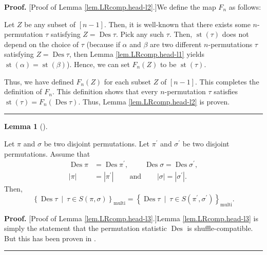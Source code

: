 \documentclass[numbers=enddot,12pt,final,onecolumn,notitlepage]{scrartcl}%
\theoremstyle{definition}
\newtheorem{lem}[theo]{Lemma}
\newenvironment{lemma}[1][]
{\begin{lem}[#1]\begin{leftbar}}
{\end{leftbar}\end{lem}}
\newenvironment{proof}[1][Proof]{\noindent\textbf{#1.} }{\ \rule{0.5em}{0.5em}}
\newenvironment{verlong}{}{}
\begin{document}
\begin{verlong}
\begin{proof}
[Proof of Lemma \ref{lem.LRcomp.head-l2}.]We define the map $F_{n}$ as follows:

Let $Z$ be any subset of $\left[  n-1\right]  $. Then, it is well-known that
there exists some $n$-permutation $\tau$ satisfying $Z=\operatorname*{Des}%
\tau$. Pick any such $\tau$. Then, $\operatorname*{st}\left(  \tau\right)  $
does not depend on the choice of $\tau$ (because if $\alpha$ and $\beta$ are
two different $n$-permutations $\tau$ satisfying $Z=\operatorname*{Des}\tau$,
then Lemma \ref{lem.LRcomp.head-l1} yields $\operatorname*{st}\left(
\alpha\right)  =\operatorname*{st}\left(  \beta\right)  $). Hence, we can set
$F_{n}\left(  Z\right)  $ to be $\operatorname*{st}\left(  \tau\right)  $.

Thus, we have defined $F_{n}\left(  Z\right)  $ for each subset $Z$ of
$\left[  n-1\right]  $. This completes the definition of $F_{n}$. This
definition shows that every $n$-permutation $\tau$ satisfies
$\operatorname*{st}\left(  \tau\right)  =F_{n}\left(  \operatorname*{Des}%
\tau\right)  $. Thus, Lemma \ref{lem.LRcomp.head-l2} is proven.
\end{proof}

\begin{lemma}
\label{lem.LRcomp.head-l3}Let $\pi$ and $\sigma$ be two disjoint permutations.
Let $\pi^{\prime}$ and $\sigma^{\prime}$ be two disjoint permutations. Assume
that%
\begin{align*}
\operatorname*{Des}\pi &  =\operatorname*{Des}\pi^{\prime}%
,\ \ \ \ \ \ \ \ \ \ \operatorname*{Des}\sigma=\operatorname*{Des}%
\sigma^{\prime},\\
\left\vert \pi\right\vert  &  =\left\vert \pi^{\prime}\right\vert
\ \ \ \ \ \ \ \ \ \ \text{and}\ \ \ \ \ \ \ \ \ \ \left\vert \sigma\right\vert
=\left\vert \sigma^{\prime}\right\vert .
\end{align*}
Then,
\[
\left\{  \operatorname*{Des}\tau\ \mid\ \tau\in S\left(  \pi,\sigma\right)
\right\}  _{\operatorname*{multi}}=\left\{  \operatorname*{Des}\tau
\ \mid\ \tau\in S\left(  \pi^{\prime},\sigma^{\prime}\right)  \right\}
_{\operatorname*{multi}}.
\]

\end{lemma}

\begin{proof}
[Proof of Lemma \ref{lem.LRcomp.head-l3}.]Lemma \ref{lem.LRcomp.head-l3} is
simply the statement that the permutation statistic $\operatorname*{Des}$ is
shuffle-compatible. But this has been proven in \cite[\S 2.4]{part1}.
\end{proof}


\end{verlong}
\end{document}
